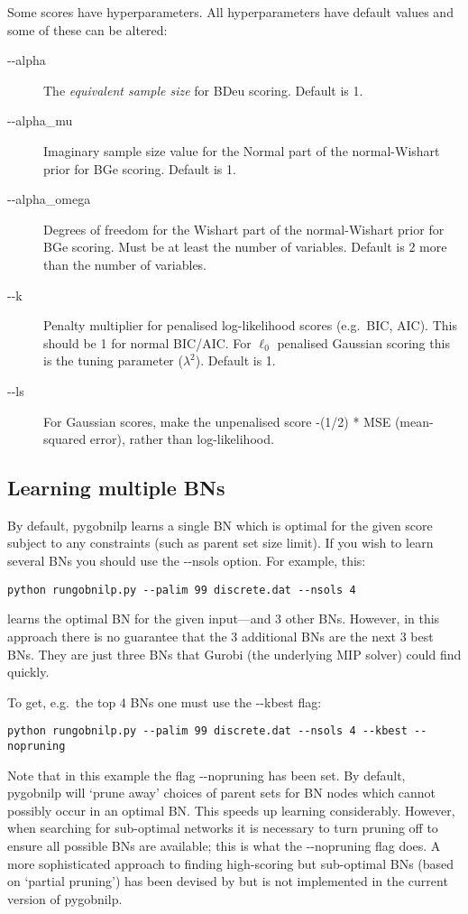 \documentclass{article}
\newcommand{\pygobnilp}{\textsf{pygobnilp}}
\begin{document}
Some scores have hyperparameters. All hyperparameters have default
values and some of these can be altered:

\begin{description}
\item[-{}-alpha] The \emph{equivalent sample size} for BDeu
  scoring. Default is 1.
\item[-{}-alpha\_mu] Imaginary sample size value for the Normal part of the
  normal-Wishart prior for BGe scoring. Default
  is 1.
\item[-{}-alpha\_omega] Degrees of freedom for
  the Wishart part of the normal-Wishart prior
  for BGe scoring. Must be at least the number
  of variables. Default is 2 more than the
  number of variables.
\item[-{}-k] Penalty multiplier for penalised log-likelihood scores
  (e.g.\ BIC, AIC). This should be 1 for normal BIC/AIC. For $\ell_0$
  penalised Gaussian scoring this is the tuning parameter ($\lambda^2$).
  Default is 1.
\item[-{}-ls] For Gaussian scores, make
  the unpenalised score -(1/2) * MSE (mean-squared
  error), rather than log-likelihood.
\end{description}

\subsection{Learning multiple BNs}
\label{sec:multiple}

By default, \pygobnilp{} learns a single BN which is optimal for the
given score subject to any constraints (such as parent set size
limit). If you wish to learn several BNs you should use the -{}-nsols
option. For example, this:
\begin{verbatim}
python rungobnilp.py --palim 99 discrete.dat --nsols 4 
\end{verbatim}
learns the optimal BN for the given input---and 3 other BNs. However,
in this approach there is no guarantee that the 3 additional BNs are
the next 3 best BNs. They are just three BNs that Gurobi (the
underlying MIP solver) could find quickly. 


To get, e.g.\ the top 4 BNs one must use the -{}-kbest flag:
\begin{verbatim}
python rungobnilp.py --palim 99 discrete.dat --nsols 4 --kbest --nopruning
\end{verbatim}
Note that in this example the flag -{}-nopruning has been set. By
default, \pygobnilp{} will `prune away' choices of parent sets for BN
nodes which cannot possibly occur in an optimal BN. This speeds up
learning considerably. However, when searching for sub-optimal
networks it is necessary to turn pruning off to ensure all possible
BNs are available; this is what the -{}-nopruning flag does. A more
sophisticated approach to finding high-scoring but sub-optimal BNs
(based on `partial pruning') has been devised by
\citet{liao19:_findin_all_bayes_networ_struc_factor_optim} but is not
implemented in the current version of \pygobnilp.
\end{document}
